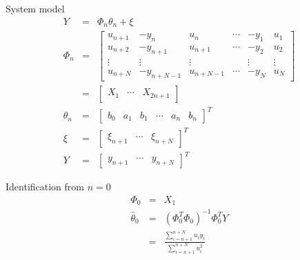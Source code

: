 \begin{frame}{System model}
\begin{eqnarray*}
Y &=& \Phi_n\theta_n +\xi \\
\Phi_n &=& \begin{bmatrix}
u_{n+1}  &   -y_{n}    & u_{n}      & \cdots & -y_{1}  & u_{1}  \\
u_{n+2}  &   -y_{n+1}  & u_{n+1}    & \cdots & -y_{2}  & u_{2}  \\
\vdots   &   \vdots    & \vdots     &        & \vdots  & \vdots \\
u_{n+N}  &   -y_{n+N-1} & u_{n+N-1} & \cdots & -y_{N}  & u_{N}
\end{bmatrix} \\
&=& \begin{bmatrix}X_1 & \cdots & X_{2n+1} \end{bmatrix} \\
\theta_n &=& \begin{bmatrix}b_0 & a_1 & b_1 & \cdots & a_n & b_n \end{bmatrix}^T \\
\xi &=& \begin{bmatrix}\xi_{n+1} &\cdots & \xi_{n+N}\end{bmatrix}^T  \\
Y &=& \begin{bmatrix}y_{n+1} &\cdots & y_{n+N}\end{bmatrix}^T 
\end{eqnarray*}
\end{frame}

\begin{frame}{Identification from $n=0$}
\begin{eqnarray*}
\Phi_0 &=& X_1 \\
\hat\theta_0 &=& (\Phi_0^T\Phi_0)^{-1}\Phi_0^T Y \\
&=& \frac{\displaystyle \sum_{i=n+1}^{n+N}u_iy_i}{\displaystyle \sum_{i=n+1}^{n+N}u_i^2}
\end{eqnarray*}
\end{frame}

